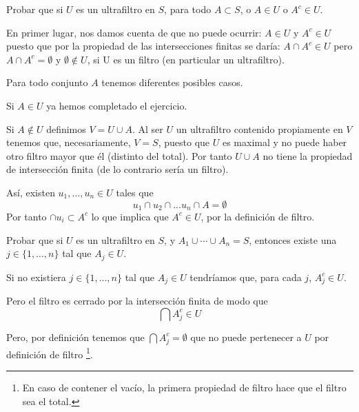 \begin{problem}
Probar que si $U$ es un ultrafiltro en $S$, para todo $A\subset S$, o $A\in U$ o $A^c\in U$.

\solution

En primer lugar, nos damos cuenta de que no puede ocurrir: $A \in U$ y $A^c \in U$ puesto que por la propiedad de las intersecciones finitas se daría: $A \cap A^c \in U$ pero  $A \cap A^c  = \emptyset$ y $\emptyset \notin U$, si U es un filtro (en particular un ultrafiltro).

Para todo conjunto $A$ tenemos diferentes posibles casos.

Si $A \in U$ ya hemos completado el ejercicio.

Si $A \notin U$ definimos $V = U \cup A$. Al ser $U$ un ultrafiltro contenido propiamente en $V$ tenemos que, necesariamente, $V=S$, puesto que $U$ es maximal y no puede haber otro filtro mayor que él (distinto del total). Por tanto $U \cup A$ no tiene la propiedad de intersección finita (de lo contrario sería un filtro).

Así, existen $u_1,...,u_n \in U$ tales que
\[u_1\cap u_2 \cap ... u_n \cap A = \emptyset\]
Por tanto $\cap u_i \subset A^c$ lo que implica que $A^c \in U$, por la definición de filtro.
\end{problem}

\begin{problem}
Probar que si $U$ es un ultrafiltro en $S$, y  $A_1 \cup \cdots \cup A_n = S$, entonces existe una $j\in \{ 1, \dots, n\}$ tal que
$A_j\in U$.

\solution

Si no existiera $j\in \{1,...,n\}$ tal que $A_j \in U$ tendríamos que, para cada $j$, $A_j^c \in U$.

Pero el filtro es cerrado por la intersección finita de modo que
\[\bigcap A_j^c \in U\]

Pero, por definición tenemos que $\bigcap A_j^c = \emptyset$ que no puede pertenecer a $U$ por definición de filtro \footnote{En caso de contener el vacío, la primera propiedad de filtro hace que el filtro sea el total.}.

\end{problem}


